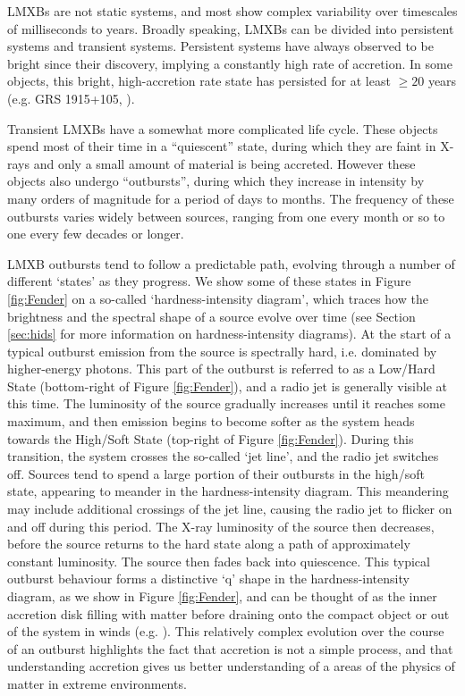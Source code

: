 \par LMXBs are not static systems, and most show complex variability over timescales of milliseconds to years.  Broadly speaking, LMXBs can be divided into persistent systems and transient systems.  Persistent systems have always observed to be bright since their discovery, implying a constantly high rate of accretion.  In some objects, this bright, high-accretion rate state has persisted for at least $\geq20$ years (e.g. GRS 1915+105, \citealp{Deegan_1915}).
\par Transient LMXBs have a somewhat more complicated life cycle.  These objects spend most of their time in a ``quiescent'' state, during which they are faint in X-rays and only a small amount of material is being accreted.  However these objects also undergo ``outbursts'', during which they increase in intensity by many orders of magnitude for a period of days to months.  The frequency of these outbursts varies widely between sources, ranging from one every month or so to one every few decades or longer.
\par LMXB outbursts tend to follow a predictable path, evolving through a number of different `states' as they progress.  We show some of these states in Figure \ref{fig:Fender} on a so-called `hardness-intensity diagram', which traces how the brightness and the spectral shape of a source evolve over time (see Section \ref{sec:hids} for more information on hardness-intensity diagrams).  At the start of a typical outburst emission from the source is spectrally hard, i.e. dominated by higher-energy photons.  This part of the outburst is referred to as a Low/Hard State (bottom-right of Figure \ref{fig:Fender}), and a radio jet is generally visible at this time.  The luminosity of the source gradually increases until it reaches some maximum, and then emission begins to become softer as the system heads towards the High/Soft State (top-right of Figure \ref{fig:Fender}).  During this transition, the system crosses the so-called `jet line', and the radio jet switches off.  Sources tend to spend a large portion of their outbursts in the high/soft state, appearing to meander in the hardness-intensity diagram.  This meandering may include additional crossings of the jet line, causing the radio jet to flicker on and off during this period.  The X-ray luminosity of the source then decreases, before the source returns to the hard state along a path of approximately constant luminosity.  The source then fades back into quiescence.  This typical outburst behaviour forms a distinctive `q' shape in the hardness-intensity diagram, as we show in Figure \ref{fig:Fender}, and can be thought of as the inner accretion disk filling with matter before draining onto the compact object or out of the system in winds (e.g. \citealp{Fender_UniJets}).  This relatively complex evolution over the course of an outburst highlights the fact that accretion is not a simple process, and that understanding accretion gives us better understanding of a areas of the physics of matter in extreme environments.

